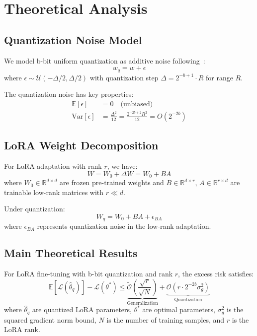 \section{Theoretical Analysis}

\subsection{Quantization Noise Model}

We model b-bit uniform quantization as additive noise following~\cite{askari2022qreg,chen2020statistical}:
\begin{equation}
w_q = w + \epsilon
\end{equation}
where $\epsilon \sim \mathcal{U}(-\Delta/2, \Delta/2)$ with quantization step $\Delta = 2^{-b+1} \cdot R$ for range $R$.

The quantization noise has key properties:
\begin{align}
\mathbb{E}[\epsilon] &= 0 \quad \text{(unbiased)} \\
\text{Var}[\epsilon] &= \frac{\Delta^2}{12} = \frac{2^{-2b+2} R^2}{12} = O(2^{-2b})
\end{align}

\subsection{LoRA Weight Decomposition}

For LoRA adaptation with rank $r$, we have:
\begin{equation}
W = W_0 + \Delta W = W_0 + BA
\end{equation}
where $W_0 \in \mathbb{R}^{d \times d}$ are frozen pre-trained weights and $B \in \mathbb{R}^{d \times r}$, $A \in \mathbb{R}^{r \times d}$ are trainable low-rank matrices with $r \ll d$.

Under quantization:
\begin{equation}
W_q = W_0 + BA + \epsilon_{BA}
\end{equation}
where $\epsilon_{BA}$ represents quantization noise in the low-rank adaptation.

\subsection{Main Theoretical Results}

\begin{theorem}
\label{thm:lora_bound}
For LoRA fine-tuning with b-bit quantization and rank $r$, the excess risk satisfies:
\begin{equation}
\mathbb{E}[\mathcal{L}(\hat{\theta}_q)] - \mathcal{L}(\theta^*) \leq \underbrace{\tilde{\mathcal{O}}\left(\frac{\sqrt{r}}{\sqrt{N}}\right)}_{\text{Generalization}} + \underbrace{\mathcal{O}\left(r \cdot 2^{-2b} \sigma_g^2\right)}_{\text{Quantization}}
\end{equation}
where $\hat{\theta}_q$ are quantized LoRA parameters, $\theta^*$ are optimal parameters, $\sigma_g^2$ is the squared gradient norm bound, $N$ is the number of training samples, and $r$ is the LoRA rank.
\end{theorem}


